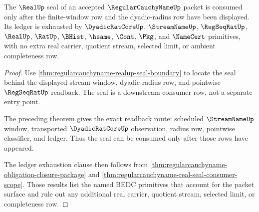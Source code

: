 \begin{theorem}
\label{thm:regularcauchyname-real-seal-ledger-exhaustion}
The $\RealUp$ seal of an accepted $\RegularCauchyNameUp$ packet is consumed only after the finite-window row and the dyadic-radius row have been displayed. Its ledger is exhausted by $\DyadicRatCoreUp$, $\StreamNameUp$, $\RegSeqRatUp$, $\RealUp$, $\RatUp$, $\BHist$, $\hsame$, $\Cont$, $\Pkg$, and $\NameCert$ primitives, with no extra real carrier, quotient stream, selected limit, or ambient completeness row.
\end{theorem}
\begin{proof}
Use \autoref{thm:regularcauchyname-realup-seal-boundary} to locate the seal behind the displayed stream window, dyadic-radius row, and pointwise $\RegSeqRatUp$ readback. The seal is a downstream consumer row, not a separate entry point.

The preceding theorem gives the exact readback route: scheduled $\StreamNameUp$ window, transported $\DyadicRatCoreUp$ observation, radius row, pointwise classifier, and ledger. Thus the seal can be consumed only after those rows have appeared.

The ledger exhaustion clause then follows from \autoref{thm:regularcauchyname-obligation-closure-package} and \autoref{thm:regularcauchyname-real-seal-consumer-scope}. Those results list the named BEDC primitives that account for the packet surface and rule out any additional real carrier, quotient stream, selected limit, or completeness row.
\end{proof}

